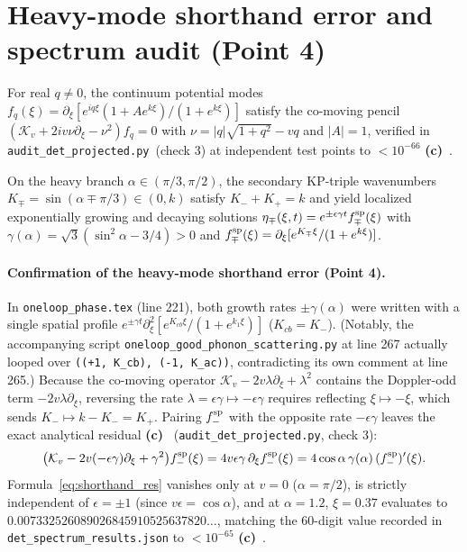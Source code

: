 \documentclass[11pt,a4paper]{article}
\newcommand{\Lc}{\textsf{\textbf{(c)}}\ }
\newcommand{\scr}{\texttt{audit\_\allowbreak det\_\allowbreak projected.py}}
\begin{document}
\section{Heavy-mode shorthand error and spectrum audit (Point 4)}
For real $q\ne0$, the continuum potential modes $f_q(\xi)=\partial_\xi[e^{iq\xi}(1+Ae^{k\xi})/(1+e^{k\xi})]$
satisfy the co-moving pencil $(\mathcal K_v+2iv\nu\partial_\xi-\nu^2)f_q=0$ with
$\nu=|q|\sqrt{1+q^2}-vq$ and $|A|=1$, verified in \scr\ (check 3) at
independent test points to $<10^{-66}$ \Lc.

On the heavy branch $\alpha\in(\pi/3,\pi/2)$, the secondary KP-triple wavenumbers
$K_\mp=\sin(\alpha\mp\pi/3)\in(0,k)$ satisfy $K_-+K_+=k$ and yield localized
exponentially growing and decaying solutions $\eta_\mp(\xi,t)=e^{\pm\epsilon\gamma t}f_\mp^{\rm sp}(\xi)$
with $\gamma(\alpha)=\sqrt3(\sin^2\alpha-3/4)>0$ and
$f_\mp^{\rm sp}(\xi)=\partial_\xi[e^{K_\mp\xi}/(1+e^{k\xi})]$.

\paragraph{Confirmation of the heavy-mode shorthand error (Point 4).}
In \texttt{oneloop\_phase.tex} (line 221), both growth rates $\pm\gamma(\alpha)$
were written with a single spatial profile $e^{\pm\gamma t}\partial_\xi^2[e^{K_{cb}\xi}/(1+e^{k_1\xi})]$
($K_{cb}=K_-$). (Notably, the accompanying script
\texttt{oneloop\_good\_phonon\_scattering.py} at line 267 actually looped over
\texttt{((+1, K\_cb), (-1, K\_ac))}, contradicting its own comment at line 265.)
Because the co-moving operator $\mathcal K_v-2v\lambda\partial_\xi+\lambda^2$
contains the Doppler-odd term $-2v\lambda\partial_\xi$, reversing the rate
$\lambda=\epsilon\gamma\mapsto-\epsilon\gamma$ requires reflecting
$\xi\mapsto-\xi$, which sends $K_-\mapsto k-K_-=K_+$. Pairing $f_-^{\rm sp}$
with the opposite rate $-\epsilon\gamma$ leaves the exact analytical residual \Lc
(\scr, check 3):
\begin{equation}\label{eq:shorthand_res}
 \big(\mathcal K_v-2v(-\epsilon\gamma)\partial_\xi+\gamma^2\big)f_-^{\rm sp}(\xi)
 = 4v\epsilon\gamma\,\partial_\xi f_-^{\rm sp}(\xi)
 = 4\cos\alpha\,\gamma(\alpha)\,(f_-^{\rm sp})'(\xi).
\end{equation}
Formula~\eqref{eq:shorthand_res} vanishes only at $v=0$ ($\alpha=\pi/2$), is
strictly independent of $\epsilon=\pm1$ (since $v\epsilon=\cos\alpha$), and at
$\alpha=1.2$, $\xi=0.37$ evaluates to
$0.007332526089026845910525637820\ldots$, matching the 60-digit value recorded in
\texttt{det\_\allowbreak spectrum\_\allowbreak results.json} to $<10^{-65}$ \Lc.
\end{document}
